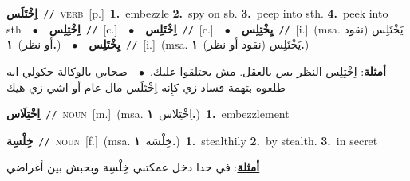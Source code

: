 \documentclass[10pt,a4paper,twoside]{article} %
\begin{document}
\begin{multicols}{2}
{\setlength\topsep{0pt}\textbf{\foreignlanguage{arabic}{اِخْتَلَس}}\ {\color{gray}\texttt{//}\color{black}}\ \textsc{verb}\ [p.]\ \textbf{1.}~embezzle  \textbf{2.}~spy on sb.  \textbf{3.}~peep into sth.  \textbf{4.}~peek into sth\ \ $\bullet$\ \ \setlength\topsep{0pt}\textbf{\foreignlanguage{arabic}{اِخْتِلِس}}\ {\color{gray}\texttt{//}\color{black}}\ [c.]\ \ $\bullet$\ \ \setlength\topsep{0pt}\textbf{\foreignlanguage{arabic}{اِخْتَلِس}}\ {\color{gray}\texttt{//}\color{black}}\ [c.]\ \ $\bullet$\ \ \setlength\topsep{0pt}\textbf{\foreignlanguage{arabic}{يِخْتِلِس}}\ {\color{gray}\texttt{//}\color{black}}\ [i.]\ \color{gray}(msa. \foreignlanguage{arabic}{يَخْتَلِس (نقود أو نظر)}~\foreignlanguage{arabic}{\textbf{١.}})\color{black}\ \ $\bullet$\ \ \setlength\topsep{0pt}\textbf{\foreignlanguage{arabic}{يِخْتَلِس}}\ {\color{gray}\texttt{//}\color{black}}\ [i.]\ \color{gray}(msa. \foreignlanguage{arabic}{يَخْتَلِس (نقود أو نظر)}~\foreignlanguage{arabic}{\textbf{١.}})\color{black}\  \begin{flushright}\color{gray}\foreignlanguage{arabic}{\textbf{\underline{\foreignlanguage{arabic}{أمثلة}}}: اِخْتِلِس النظر بس بالعقل. مش يجتلقوا عليك.\ $\bullet$\ \  صحابي بالوكالة حكولي انه طلعوه بتهمة فساد زي كإِنه اِخْتَلَس مال عام أو اشي زي هيك}\end{flushright}\color{black}} \vspace{2mm}

{\setlength\topsep{0pt}\textbf{\foreignlanguage{arabic}{اِخْتِلَاس}}\ {\color{gray}\texttt{//}\color{black}}\ \textsc{noun}\ [m.]\ \color{gray}(msa. \foreignlanguage{arabic}{اِخْتِلاس}~\foreignlanguage{arabic}{\textbf{١.}})\color{black}\ \textbf{1.}~embezzlement\ } \vspace{2mm}

{\setlength\topsep{0pt}\textbf{\foreignlanguage{arabic}{خِلْسِة}}\ {\color{gray}\texttt{//}\color{black}}\ \textsc{noun}\ [f.]\ \color{gray}(msa. \foreignlanguage{arabic}{خِلْسَة}~\foreignlanguage{arabic}{\textbf{١.}})\color{black}\ \textbf{1.}~stealthily  \textbf{2.}~by stealth.  \textbf{3.}~in secret\  \begin{flushright}\color{gray}\foreignlanguage{arabic}{\textbf{\underline{\foreignlanguage{arabic}{أمثلة}}}: في حدا دخل عمكتبي خِلْسِة وبحبش بين أغراضي}\end{flushright}\color{black}} \vspace{2mm}


\end{multicols}
\end{document}

